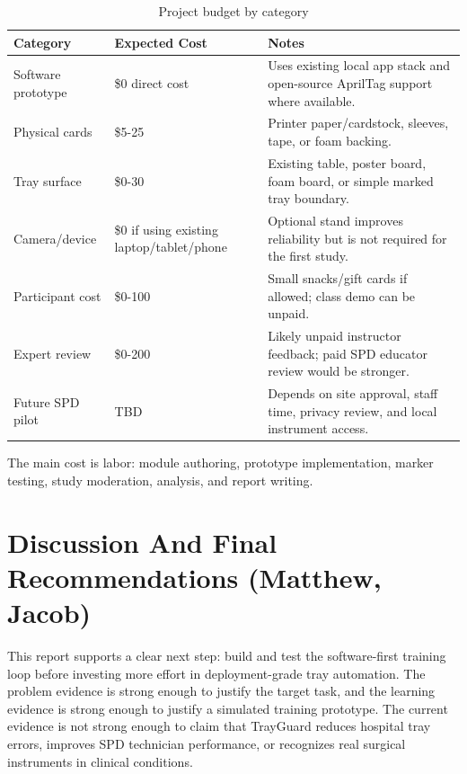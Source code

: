 \documentclass[10pt,a4paper]{article}
\begin{document}
\begin{table}[H]
\centering
\caption{Project budget by category}
\label{tab:project-budget-by-category}
\small\renewcommand{\arraystretch}{1.2}\setlength{\tabcolsep}{4pt}
\begin{tabularx}{\textwidth}{|>{\raggedright\arraybackslash}X|>{\raggedright\arraybackslash}X|>{\raggedright\arraybackslash}X|}
\hline
Category & Expected Cost & Notes \\
\hline
Software prototype & \$0 direct cost & Uses existing local app stack and open-source AprilTag support where available. \\
\hline
Physical cards & \$5-25 & Printer paper/cardstock, sleeves, tape, or foam backing. \\
\hline
Tray surface & \$0-30 & Existing table, poster board, foam board, or simple marked tray boundary. \\
\hline
Camera/device & \$0 if using existing laptop/tablet/phone & Optional stand improves reliability but is not required for the first study. \\
\hline
Participant cost & \$0-100 & Small snacks/gift cards if allowed; class demo can be unpaid. \\
\hline
Expert review & \$0-200 & Likely unpaid instructor feedback; paid SPD educator review would be stronger. \\
\hline
Future SPD pilot & TBD & Depends on site approval, staff time, privacy review, and local instrument access. \\
\hline
\end{tabularx}
\end{table}
The main cost is labor: module authoring, prototype implementation, marker
testing, study moderation, analysis, and report writing.






\section{Discussion And Final Recommendations \hfill {\normalfont\small (Matthew, Jacob)}}
\label{sec:discussion-and-final-recommendations}

This report supports a clear next step: build and test the software-first training
loop before investing more effort in deployment-grade tray automation. The
problem evidence is strong enough to justify the target task, and the learning
evidence is strong enough to justify a simulated training prototype. The
current evidence is not strong enough to claim that TrayGuard reduces hospital
tray errors, improves SPD technician performance, or recognizes real surgical
instruments in clinical conditions.
\end{document}
